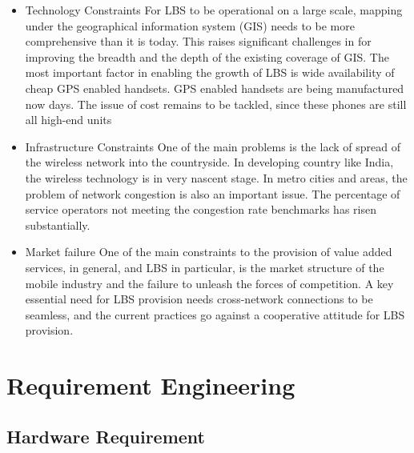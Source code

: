	\begin{itemize}
	
	
	
	  \item Technology Constraints 
	For LBS to be operational on a large scale, mapping under 
	the geographical information system (GIS) needs to be 
	more comprehensive than it is today. This raises 
	significant challenges in for improving the breadth and the 
	depth of the existing coverage of GIS. The most important 
	factor in enabling the growth of LBS is wide availability of 
	cheap GPS enabled handsets. GPS enabled handsets are 
	being manufactured now days. The issue of cost remains to 
	be tackled, since these phones are still all high-end units
	
	\item Infrastructure Constraints 
	One of the main problems is the lack of spread of the 
	wireless network into the countryside. In developing 
	country like India, the wireless technology is in very 
	nascent stage. In metro cities and areas, the problem of 
	network congestion is also an important issue. The 
	percentage of service operators not meeting the congestion 
	rate benchmarks has risen substantially.
	
	\item Market failure 
	One of the main constraints to the provision of value added 
	services, in general, and LBS in particular, is the market 
	structure of the mobile industry and the failure to unleash 
	the forces of competition. A key essential need for LBS 
	provision needs cross-network connections to be seamless, 
	and the current practices go against a cooperative attitude 
	for LBS provision. 
	
	
	
	\end{itemize}
	
	
	
	
	
	
	

	
	\chapter{Requirement Engineering}
	
	
	
	
	\section{Hardware Requirement }
	
